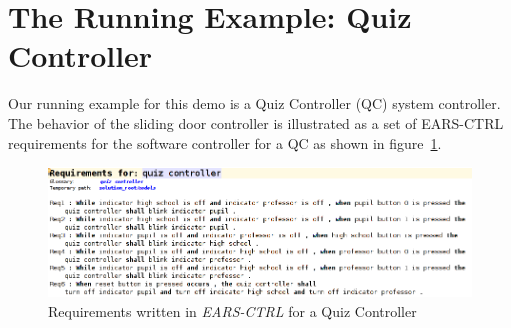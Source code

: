 \vspace{-.5cm}
\section{The Running Example: Quiz Controller}
\label{sec:example}
\vspace{-.3cm}
Our running example for this demo is a Quiz Controller (QC) system
controller. The behavior of the sliding door controller is illustrated as a set
of \textsf{EARS-CTRL} requirements for the software controller for a QC as shown in
figure~\ref{fig:QC_reqs}.
\begin{figure}[!h]
\centering
\includegraphics[width=1\textwidth]{./images/QC_Reqs.png}
\caption{Requirements written in \emph{EARS-CTRL} for a Quiz Controller}
\label{fig:QC_reqs}
\end{figure}